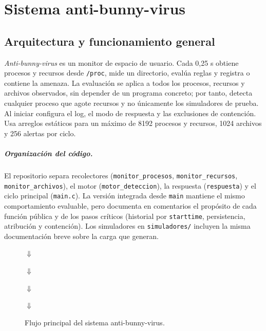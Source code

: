 \chapter{Sistema anti-bunny-virus}

\section{Arquitectura y funcionamiento general}

\emph{Anti-bunny-virus} es un monitor de espacio de usuario. Cada 0,25 s obtiene
procesos y recursos desde \texttt{/proc}, mide un directorio, evalúa reglas y
registra o contiene la amenaza. La evaluación se aplica a todos los procesos,
recursos y archivos observados, sin depender de un programa concreto; por tanto,
detecta cualquier proceso que agote recursos y no únicamente los simuladores de
prueba. Al iniciar configura el log, el modo de respuesta y las exclusiones de
contención. Usa arreglos estáticos para un máximo de
8192 procesos y recursos, 1024 archivos y 256 alertas por ciclo.

\paragraph{Organización del código.}
El repositorio separa recolectores (\texttt{monitor\_procesos},
\texttt{monitor\_recursos}, \texttt{monitor\_archivos}), el motor
(\texttt{motor\_deteccion}), la respuesta (\texttt{respuesta}) y el ciclo
principal (\texttt{main.c}). La versión integrada desde \texttt{main} mantiene
el mismo comportamiento evaluable, pero documenta en comentarios el propósito de
cada función pública y de los pasos críticos (historial por
\texttt{starttime}, persistencia, atribución y contención). Los simuladores en
\texttt{simuladores/} incluyen la misma documentación breve sobre la carga que
generan.

\begin{figure}[htbp]
  \centering
  \par\smallskip$\Downarrow$\par\smallskip
  \par\smallskip$\Downarrow$\par\smallskip
  \par\smallskip$\Downarrow$\par\smallskip
  \par\smallskip$\Downarrow$\par\smallskip
  \caption{Flujo principal del sistema anti-bunny-virus.}
  \label{fig:flujo-sistema}
\end{figure}

